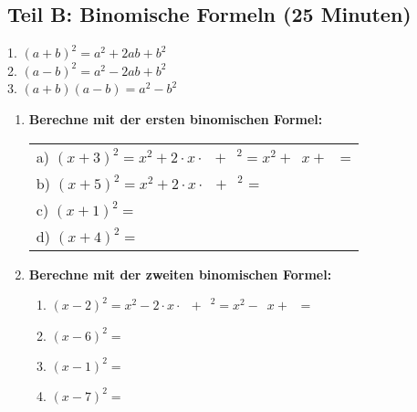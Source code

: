 \subsection*{Teil B: Binomische Formeln (25 Minuten)}

\begin{merkbox}
    1. $(a + b)^2 = a^2 + 2ab + b^2$ \\
    2. $(a - b)^2 = a^2 - 2ab + b^2$ \\
    3. $(a + b)(a - b) = a^2 - b^2$
\end{merkbox}

\begin{enumerate}[label=\arabic*., resume]

    \item \textbf{Berechne mit der ersten binomischen Formel:}

    \vspace{0.5cm}

    \begin{tabular}{l}
        a) $(x + 3)^2 = x^2 + 2 \cdot x \cdot \phantom{0} + \phantom{0}^2 = x^2 + \phantom{0}x + \phantom{0}$ = \underline{\hspace{3cm}} \\[3ex]
        b) $(x + 5)^2 = x^2 + 2 \cdot x \cdot \phantom{0} + \phantom{0}^2$ = \underline{\hspace{4cm}} \\[3ex]
        c) $(x + 1)^2 = $ \underline{\hspace{6cm}} \\[3ex]
        d) $(x + 4)^2 = $ \underline{\hspace{6cm}}
    \end{tabular}

    \vspace{1cm}

    \item \textbf{Berechne mit der zweiten binomischen Formel:}

    \vspace{0.5cm}

    \begin{enumerate}[label=\alph*)]
        \item $(x - 2)^2 = x^2 - 2 \cdot x \cdot \phantom{0} + \phantom{0}^2 = x^2 - \phantom{0}x + \phantom{0}$ = \underline{\hspace{3cm}}
        \vspace{0.5cm}
        \item $(x - 6)^2 = $ \underline{\hspace{6cm}}
        \vspace{0.5cm}
        \item $(x - 1)^2 = $ \underline{\hspace{6cm}}
        \vspace{0.5cm}
        \item $(x - 7)^2 = $ \underline{\hspace{6cm}}
    \end{enumerate}


\end{enumerate}
